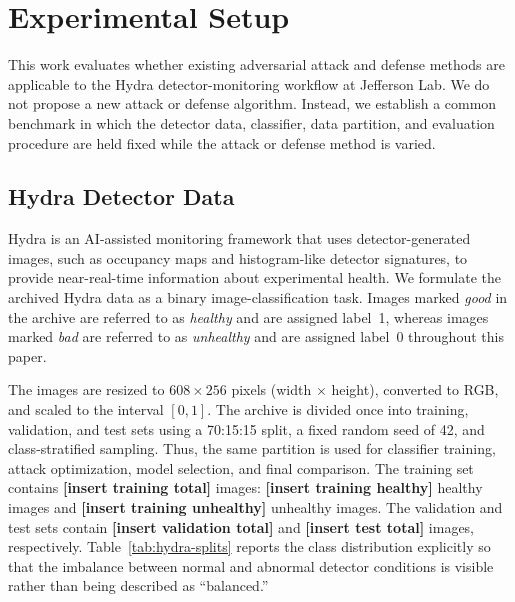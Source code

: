 \newcommand{\NumTrainingImages}{\textbf{[insert training total]}}
\newcommand{\NumTrainingHealthy}{\textbf{[insert training healthy]}}
\newcommand{\NumTrainingUnhealthy}{\textbf{[insert training unhealthy]}}
\newcommand{\NumValidationImages}{\textbf{[insert validation total]}}
\newcommand{\NumTestImages}{\textbf{[insert test total]}}

\section{Experimental Setup}
\label{sec:experimental-setup}

This work evaluates whether existing adversarial attack and defense methods are
applicable to the Hydra detector-monitoring workflow at Jefferson Lab.  We do
not propose a new attack or defense algorithm.  Instead, we establish a common
benchmark in which the detector data, classifier, data partition, and evaluation
procedure are held fixed while the attack or defense method is varied.

\subsection{Hydra Detector Data}

Hydra is an AI-assisted monitoring framework that uses detector-generated
images, such as occupancy maps and histogram-like detector signatures, to
provide near-real-time information about experimental health.  We formulate
the archived Hydra data as a binary image-classification task.  Images marked
\emph{good} in the archive are referred to as \emph{healthy} and are assigned
label~1, whereas images marked \emph{bad} are referred to as \emph{unhealthy}
and are assigned label~0 throughout this paper.

The images are resized to $608\times256$ pixels (width $\times$ height),
converted to RGB, and scaled to the interval $[0,1]$.  The archive is divided
once into training, validation, and test sets using a 70:15:15 split, a fixed
random seed of 42, and class-stratified sampling.  Thus, the same partition is
used for classifier training, attack optimization, model selection, and final
comparison.  The training set contains \NumTrainingImages{} images:
\NumTrainingHealthy{} healthy images and \NumTrainingUnhealthy{} unhealthy
images.  The validation and test sets contain \NumValidationImages{} and
\NumTestImages{} images, respectively.  Table~\ref{tab:hydra-splits} reports the
class distribution explicitly so that the imbalance between normal and
abnormal detector conditions is visible rather than being described as
``balanced.''


